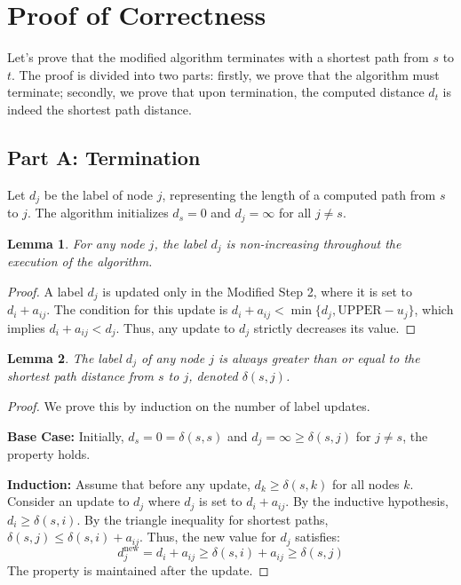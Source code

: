 \documentclass[11pt, a4paper, oneside]{memoir}
\newtheorem{lemma}{Lemma}
\newcommand{\UPPER}{\text{UPPER}}
\begin{document}
\section{Proof of Correctness}
Let's prove that the modified algorithm terminates with a shortest path from $s$ to $t$.
The proof is divided into two parts: firstly, we prove that the algorithm must terminate;
secondly, we prove that upon termination, the computed distance $d_t$ is indeed the shortest path distance.

\subsection*{Part A: Termination}
Let $d_j$ be the label of node $j$, representing the length of a computed path from $s$ to $j$.
The algorithm initializes $d_s = 0$ and $d_j = \infty$ for all $j \neq s$.

\begin{lemma}
For any node $j$, the label $d_j$ is non-increasing throughout the execution of the algorithm.
\end{lemma}

\begin{proof}
A label $d_j$ is updated only in the Modified Step 2, where it is set to $d_i + a_{ij}$.
The condition for this update is $d_i + a_{ij} < \min\{d_j, \UPPER - u_j\}$, which implies $d_i + a_{ij} < d_j$.
Thus, any update to $d_j$ strictly decreases its value.
\end{proof}

\begin{lemma}
The label $d_j$ of any node $j$ is always greater than or equal to the shortest path distance from $s$ to $j$,
denoted $\delta(s, j)$.
\end{lemma}

\begin{proof}
We prove this by induction on the number of label updates.

\textbf{Base Case:} Initially, $d_s = 0 = \delta(s, s)$ and $d_j = \infty \ge \delta(s, j)$ for $j \neq s$, the property holds.

\textbf{Induction:} Assume that before any update, $d_k \ge \delta(s, k)$ for all nodes $k$.
Consider an update to $d_j$ where $d_j$ is set to $d_i + a_{ij}$. By the inductive hypothesis,
$d_i \ge \delta(s, i)$. By the triangle inequality for shortest paths, $\delta(s, j) \le \delta(s, i) + a_{ij}$.
Thus, the new value for $d_j$ satisfies:
\[ d_j^{\text{new}} = d_i + a_{ij} \ge \delta(s, i) + a_{ij} \ge \delta(s, j) \]
The property is maintained after the update.
\end{proof}
\end{document}
